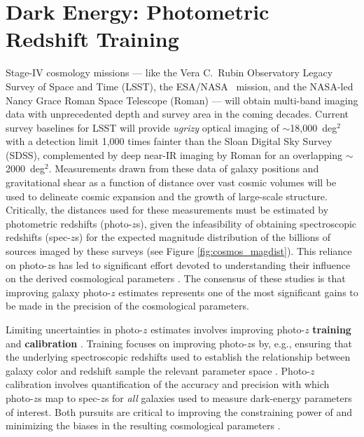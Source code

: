 \documentclass[11pt,a4paper,twoside,onecolumn,openany,final,oldfontcommands]{memoir}
\begin{document}

\section{Dark Energy: Photometric Redshift Training}
\label{sec:photozs}

Stage-IV cosmology missions --- like the Vera C.~Rubin Observatory Legacy Survey of Space and Time (LSST), the ESA/NASA \euclid\ mission, and the NASA-led Nancy Grace Roman Space Telescope (Roman) --- will obtain multi-band imaging data with unprecedented depth and survey area in the coming decades.  Current survey baselines for LSST will provide \textit{ugrizy} optical imaging of $\sim$18,000~deg$^{2}$ with a detection limit 1,000 times fainter than the Sloan Digital Sky Survey (SDSS), complemented by deep near-IR imaging by Roman for an overlapping $\sim$2000~deg$^{2}$.  Measurements drawn from these data of galaxy positions and gravitational shear as a function of distance over vast cosmic volumes will be used to delineate cosmic expansion and the growth of large-scale structure. Critically, the distances used for these measurements must be estimated by photometric redshifts (photo-$z$s), given the infeasibility of obtaining spectroscopic redshifts (spec-$z$s) for the expected magnitude distribution of the billions of sources imaged by these surveys (see Figure \ref{fig:cosmos_magdist}).  This reliance on photo-$z$s has led to significant effort devoted to understanding their influence on the derived cosmological parameters \citep{huterer06, hearin10, newman15, LSSTDESCSRD}.  The consensus of these studies is that improving galaxy photo-$z$ estimates represents one of the most significant gains to be made in the precision of the cosmological parameters.

Limiting uncertainties in photo-$z$ estimates involves improving photo-$z$ \textbf{training} and \textbf{calibration} \citep{newman15}.  Training focuses on improving photo-$z$s by, e.g., ensuring that the underlying spectroscopic redshifts used to establish the relationship between galaxy color and redshift sample the relevant parameter space \citep{masters15, hemmati18}.  Photo-$z$ calibration involves quantification of the accuracy and precision with which photo-$z$s map to spec-$z$s for \textit{all} galaxies used to measure dark-energy parameters of interest.  Both pursuits are critical to improving the constraining power of and minimizing the biases in the resulting cosmological parameters \citep{LSSTDESCSRD}.
\end{document}
